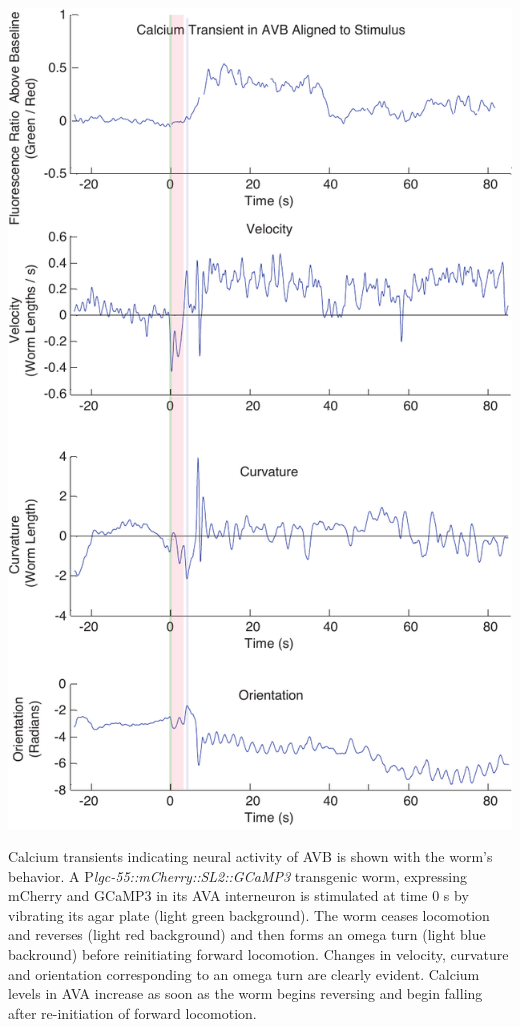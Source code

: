 \begin{FPfigure}  %
\includegraphics[width=\textwidth]{figures/omegaAVBrep}
\caption[Neural activity of AVB and associated behavior.]{Calcium transients indicating neural activity of AVB is shown with the worm's behavior.  A P\textit{lgc-55::mCherry::SL2::GCaMP3} transgenic worm, expressing mCherry and GCaMP3 in its AVA interneuron is stimulated at time 0 s by vibrating its agar plate (light green background).  The worm ceases locomotion and reverses (light red background) and then forms an omega turn (light blue backround) before reinitiating forward locomotion. Changes in velocity, curvature and orientation corresponding to an omega turn are clearly evident.  Calcium levels in AVA increase as soon as the worm begins reversing and begin falling after re-initiation of forward locomotion. \label{fig:omegaAVBrep}}
\end{FPfigure}
\afterpage{\clearpage}




